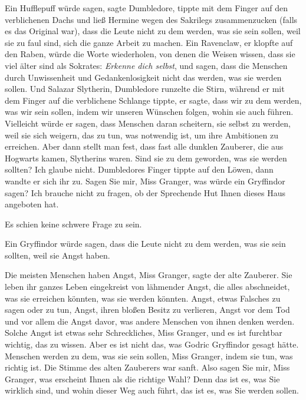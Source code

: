 \glqq Ein Hufflepuff würde sagen\grqq{}, sagte Dumbledore, tippte mit dem Finger
auf den verblichenen Dachs und ließ Hermine wegen des Sakrilegs zusammenzucken
(falls es das Original war), \glqq dass die Leute nicht zu dem werden, was sie
sein sollen, weil sie zu faul sind, sich die ganze Arbeit zu machen. Ein
Ravenclaw\grqq{}, er klopfte auf den Raben, \glqq würde die Worte wiederholen,
von denen die Weisen wissen, dass sie viel älter sind als Sokrates:
\emph{Erkenne dich selbst}, und sagen, dass die Menschen durch Unwissenheit und
Gedankenlosigkeit nicht das werden, was sie werden sollen. Und Salazar
Slytherin\grqq{}, Dumbledore runzelte die Stirn, während er mit dem Finger auf
die verblichene Schlange tippte, \glqq er sagte, dass wir zu dem werden, was wir
sein sollen, indem wir unseren Wünschen folgen, wohin sie auch führen.
Vielleicht würde er sagen, dass Menschen daran scheitern, sie selbst zu werden,
weil sie sich weigern, das zu tun, was notwendig ist, um ihre Ambitionen zu
erreichen. Aber dann stellt man fest, dass fast alle dunklen Zauberer, die aus
Hogwarts kamen, Slytherins waren. Sind sie zu dem geworden, was sie werden
sollten? Ich glaube nicht.\grqq{} Dumbledores Finger tippte auf den Löwen, dann
wandte er sich ihr zu. \glqq Sagen Sie mir, Miss Granger, was würde ein
Gryffindor sagen? Ich brauche nicht zu fragen, ob der Sprechende Hut Ihnen
dieses Haus angeboten hat.\grqq{}

Es schien keine schwere Frage zu sein.

\glqq Ein Gryffindor würde sagen, dass die Leute nicht zu dem werden, was sie
sein sollten, weil sie Angst haben.\grqq{}

\glqq Die meisten Menschen haben Angst, Miss Granger\grqq{}, sagte der alte
Zauberer. \glqq Sie leben ihr ganzes Leben eingekreist von lähmender Angst, die
alles abschneidet, was sie erreichen könnten, was sie werden könnten. Angst,
etwas Falsches zu sagen oder zu tun, Angst, ihren bloßen Besitz zu verlieren,
Angst vor dem Tod und vor allem die Angst davor, was andere Menschen von ihnen
denken werden. Solche Angst ist etwas sehr Schreckliches, Miss Granger, und es
ist furchtbar wichtig, das zu wissen. Aber es ist nicht das, was Godric
Gryffindor gesagt hätte. Menschen werden zu dem, was sie sein sollen, Miss
Granger, indem sie tun, was richtig ist.\grqq{} Die Stimme des alten Zauberers
war sanft. \glqq Also sagen Sie mir, Miss Granger, was erscheint Ihnen als die
richtige Wahl? Denn das ist es, was Sie wirklich sind, und wohin dieser Weg auch
führt, das ist es, was Sie werden sollen.\grqq{}

